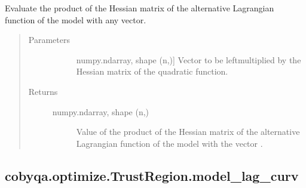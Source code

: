 \documentclass[letterpaper,10pt,english]{sphinxmanual}
\begin{document}
\begin{fulllineitems}
\begin{fulllineitems}
\label{\detokenize{refs/generated/cobyqa.optimize.TrustRegion.model_lag_alt_hessp:cobyqa.optimize.TrustRegion.model_lag_alt_hessp}}
\sphinxAtStartPar
Evaluate the product of the Hessian matrix of the alternative Lagrangian
function of the model with any vector.
\begin{quote}\begin{description}
\item[{Parameters}] \leavevmode\begin{description}
\item[{}] \leavevmode{[}numpy.ndarray, shape (n,){]}
\sphinxAtStartPar
Vector to be left\sphinxhyphen{}multiplied by the Hessian matrix of the quadratic
function.

\end{description}

\item[{Returns}] \leavevmode\begin{description}
\item[{numpy.ndarray, shape (n,)}] \leavevmode
\sphinxAtStartPar
Value of the product of the Hessian matrix of the alternative
Lagrangian function of the model with the vector .

\end{description}

\end{description}\end{quote}

\end{fulllineitems}



\subsection{cobyqa.optimize.TrustRegion.model\_lag\_curv}
\label{\detokenize{refs/generated/cobyqa.optimize.TrustRegion.model_lag_curv:cobyqa-optimize-trustregion-model-lag-curv}}\label{\detokenize{refs/generated/cobyqa.optimize.TrustRegion.model_lag_curv::doc}}


\end{fulllineitems}
\end{document}
